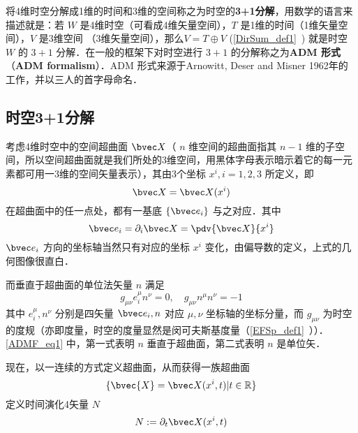 
\begin{issues}
\issueTODO
\end{issues}

将4维时空分解成1维的时间和3维的空间称之为时空的\textbf{3+1分解}，用数学的语言来描述就是：若 $W$ 是4维时空（可看成4维矢量空间），$T$ 是1维的时间（1维矢量空间），$V$ 是3维空间 （3维矢量空间），那么$V=T\oplus V$ (\autoref{DirSum_def1}~) 就是时空 $W$ 的 $3+1$ 分解．在一般的框架下对时空进行 $3+1$ 的分解称之为\textbf{ADM 形式}（\textbf{ADM formalism}）．ADM 形式来源于Arnowitt, Deser and Misner 1962年的工作，并以三人的首字母命名．
\subsection{时空3+1分解}
考虑4维时空中的空间超曲面 $\bvec X$（ $n$ 维空间的超曲面指其 $n-1$ 维的子空间，所以空间超曲面就是我们所处的3维空间，用黑体字母表示暗示着它的每一元素都可用一3维的空间矢量表示），其由3个坐标 $x^i,i=1,2,3$ 所定义，即 
\begin{equation}
\bvec X=\bvec X(x^i)
\end{equation}
在超曲面中的任一点处，都有一基底 $\{\bvec e_i\}$ 与之对应．其中
\begin{equation}
\bvec e_i=\partial_i \bvec X=\pdv{\bvec X}{x^i}
\end{equation}
$\bvec e_i$ 方向的坐标轴当然只有对应的坐标 $x^i$ 变化，由偏导数的定义，上式的几何图像很直白．

而垂直于超曲面的单位法矢量 $n$ 满足
\begin{equation}\label{ADMF_eq1}
g_{\mu\nu} e_i^\mu n^\nu=0,\quad g_{\mu\nu}n^\mu n^\nu=-1
\end{equation}
其中 $e_i^\mu,n^\nu$ 分别是四矢量 $\bvec e_i,n$ 对应 $\mu,\nu$ 坐标轴的坐标分量，而 $g_{\mu\nu}$ 为时空的度规（亦即度量，时空的度量显然是闵可夫斯基度量（\autoref{EFSp_def1}~））．\autoref{ADMF_eq1} 中，第一式表明 $n$ 垂直于超曲面，第二式表明 $n$ 是单位矢．

现在，以一连续的方式定义超曲面，从而获得一族超曲面 
\begin{equation}
\{\bvec{X}=\bvec X(x^i,t)|t\in\mathbb R\}
\end{equation}
定义时间演化4矢量 $N$
\begin{equation}
N:=\partial_t \bvec X(x^i,t)
\end{equation}


